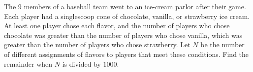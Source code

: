 The 9 members of a baseball team went to an ice-cream parlor after their game. Each player had a singlescoop cone of chocolate, vanilla, or strawberry ice cream. At least one player chose each flavor, and the number of players who chose chocolate was greater than the number of players who chose vanilla, which was greater than the number of players who chose strawberry. Let $N$ be the number of different assignments of flavors to players that meet these conditions. Find the remainder when $N$ is divided by $1000.$